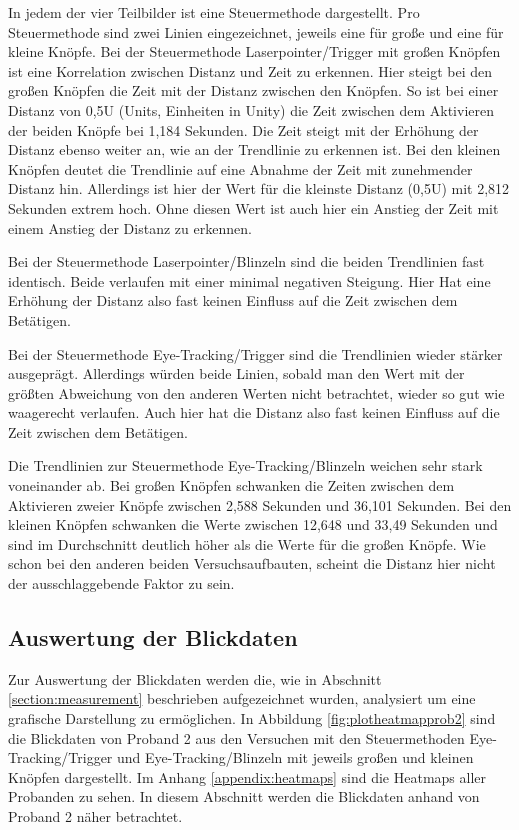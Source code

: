 In jedem der vier Teilbilder ist eine Steuermethode dargestellt. Pro Steuermethode sind zwei Linien eingezeichnet, jeweils eine für große und eine für kleine Knöpfe. Bei der Steuermethode Laserpointer/Trigger mit großen Knöpfen ist eine Korrelation zwischen Distanz und Zeit zu erkennen. Hier steigt bei den großen Knöpfen die Zeit mit der Distanz zwischen den Knöpfen. So ist bei einer Distanz von 0,5U (Units, Einheiten in Unity) die Zeit zwischen dem Aktivieren der beiden Knöpfe bei 1,184 Sekunden. Die Zeit steigt mit der Erhöhung der Distanz ebenso weiter an, wie an der Trendlinie zu erkennen ist. Bei den kleinen Knöpfen deutet die Trendlinie auf eine Abnahme der Zeit mit zunehmender Distanz hin. Allerdings ist hier der Wert für die kleinste Distanz (0,5U) mit 2,812 Sekunden extrem hoch. Ohne diesen Wert ist auch hier ein Anstieg der Zeit mit einem Anstieg der Distanz zu erkennen. 

Bei der Steuermethode Laserpointer/Blinzeln sind die beiden Trendlinien fast identisch. Beide verlaufen mit einer minimal negativen Steigung. Hier Hat eine Erhöhung der Distanz also fast keinen Einfluss auf die Zeit zwischen dem Betätigen.

Bei der Steuermethode Eye-Tracking/Trigger sind die Trendlinien wieder stärker ausgeprägt. Allerdings würden beide Linien, sobald man den Wert mit der größten Abweichung von den anderen Werten nicht betrachtet, wieder so gut wie waagerecht verlaufen. Auch hier hat die Distanz also fast keinen Einfluss auf die Zeit zwischen dem Betätigen. 

Die Trendlinien zur Steuermethode Eye-Tracking/Blinzeln weichen sehr stark voneinander ab. Bei großen Knöpfen schwanken die Zeiten zwischen dem Aktivieren zweier Knöpfe zwischen 2,588 Sekunden und 36,101 Sekunden.  Bei den kleinen Knöpfen schwanken die Werte zwischen 12,648 und 33,49 Sekunden und sind im Durchschnitt deutlich höher als die Werte für die großen Knöpfe. Wie schon bei den anderen beiden Versuchsaufbauten, scheint die Distanz hier nicht der ausschlaggebende Faktor zu sein.

\subsection{Auswertung der Blickdaten}
Zur Auswertung der Blickdaten werden die, wie in Abschnitt \ref{section:measurement} beschrieben aufgezeichnet wurden, analysiert um eine grafische Darstellung zu ermöglichen. In Abbildung \ref{fig:plotheatmapprob2} sind die Blickdaten von Proband 2 aus den Versuchen mit den Steuermethoden Eye-Tracking/Trigger und Eye-Tracking/Blinzeln mit jeweils großen und kleinen Knöpfen dargestellt. Im Anhang \ref{appendix:heatmaps} sind die Heatmaps aller Probanden zu sehen. In diesem Abschnitt werden die Blickdaten anhand von Proband 2 näher betrachtet.  


